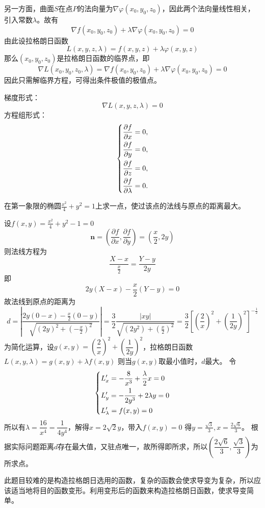 另一方面，曲面$S$在点$P$的法向量为$\nabla\varphi(x_0,y_0,z_0)$，因此两个法向量线性相关，引入常数$\lambda$。故有
\[ \nabla f(x_0,y_0,z_0) + \lambda\nabla\varphi(x_0,y_0,z_0) = 0 \]
由此设拉格朗日函数
\begin{equation}
    \label{eq:拉格朗日函数}
    L(x,y,z,\lambda) = f(x,y,z) + \lambda\varphi(x,y,z)
\end{equation}
那么$(x_0,y_0,z_0)$是拉格朗日函数的临界点，即
\[ \nabla L(x_0,y_0,z_0,\lambda) = \nabla f(x_0,y_0,z_0) + \lambda\nabla\varphi(x_0,y_0,z_0) = 0 \]
因此只需解临界方程，可得出条件极值的极值点。

梯度形式：
\begin{equation}
    \label{eq:拉格朗日临界方程}
    \nabla L(x,y,z,\lambda) = 0
\end{equation}
方程组形式：
\begin{equation}
    \begin{dcases*}
        \frac{\partial f}{\partial x} = 0,       \\
        \frac{\partial f}{\partial y} = 0,       \\
        \frac{\partial f}{\partial z} = 0,       \\
        \frac{\partial f}{\partial \lambda} = 0. \\
    \end{dcases*}
\end{equation}

\begin{example}
    在第一象限的椭圆$\frac{x^2}{4} + y^2 = 1$上求一点，使过该点的法线与原点的距离最大。
\end{example}
\begin{solution}
    设$f(x,y) = \frac{x^2}{4} + y^2 - 1 = 0$
    \[ \bm{n} = \left(\frac{\partial f}{\partial x}, \frac{\partial f}{\partial y}\right) = \left(\frac{x}{2}, 2y\right) \]
    则法线方程为
    \[ \frac{X - x}{\frac{x}{2}} = \frac{Y - y}{2y} \]
    即
    \[ 2y(X-x)-\frac{x}{2}(Y-y) = 0 \]
    故法线到原点的距离为
    \[
        d
        = \left| \frac{2y(0-x)-\frac{x}{2}(0-y)}{\sqrt{(2y)^2 + \left(-\frac{x}{2}\right)^2}} \right|
        = \frac{3}{2}\frac{|xy|}{\sqrt{(2y^2)+\left(\frac{x}{2}\right)^2}}
        = \frac{3}{2} \left[\left(\frac{2}{x}\right)^2 + \left(\frac{1}{2y}\right)^2\right]^{-\frac{1}{2}}
    \]
    为简化运算，设$g(x,y) = (\dfrac{2}{x})^2 + (\dfrac{1}{2y})^2$，拉格朗日函数$L(x,y,\lambda) = g(x,y) + \lambda f(x,y)$
    则当$g(x,y)$取最小值时，$d$最大。
    令
    \[
        \begin{dcases}
            L'_x = -\frac{8}{x^3} + \frac{\lambda}{2} x = 0 \\
            L'_y = -\frac{1}{2y^3} + 2\lambda y = 0         \\
            L'_\lambda = f(x,y)=0
        \end{dcases}
    \]
    所以有$\lambda = \dfrac{16}{x^4} = \dfrac{1}{4y^4}$，解得$x=2\sqrt{2}y$，带入$f(x,y)=0$
    得$y = \frac{\sqrt{3}}{3},x=\frac{2\sqrt{6}}{3}$。
    根据实际问题距离$d$存在最大值，又驻点唯一，故所得即所求，所以$\left(\dfrac{2\sqrt{6}}{3}, \dfrac{\sqrt{3}}{3}\right)$为所求点。
\end{solution}

此题目较难的是构造拉格朗日选用的函数，复杂的函数会使求导变为复杂，所以应该适当地将目的函数变形。利用变形后的函数来构造拉格朗日函数，使求导变简单。